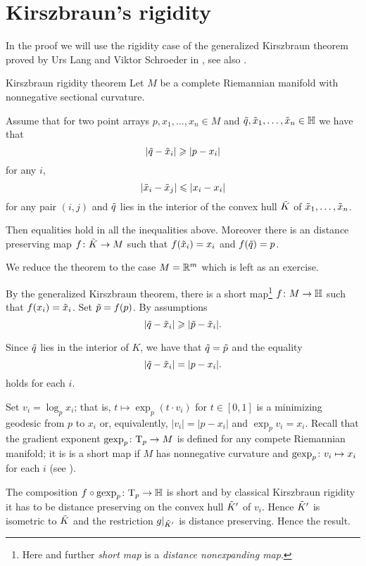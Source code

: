 \section{Kirszbraun's rigidity}

In the proof we will use the rigidity case of the generalized Kirszbraun theorem proved by Urs Lang and Viktor Schroeder in \cite{LS}, see also \cite{AKP}.

\begin{thm}{Kirszbraun rigidity theorem}\label{thm:kirszbraun-rigid}
Let $M$ be a complete Riemannian manifold with nonnegative sectional curvature.

Assume that for two point arrays $p,x_1,\dots,x_n\in M$ and $\~q, \~x_1,\dots,\~x_n\in \HH$ we have that 
\[|\~q-\~x_i|\ge |p-x_i|\]
for any $i$,
\[|\~x_i-\~x_j|\le |x_i-x_i|\]
for any pair $(i,j)$
and $\~q$ lies in the interior of the convex hull $\~K$ of $\~x_1,\dots,\~x_n$.

Then equalities hold in all the inequalities above.
Moreover there is an distance preserving map $f\:\~K\to M$ such that $f(\~x_i)=x_i$ and $f(\~q)=p$. 
\end{thm}

We reduce the theorem to the case $M=\RR^m$ which is left as an exercise.

By the generalized Kirszbraun theorem, there is a short map\footnote{Here and further \emph{short map} is a \emph{distance nonexpanding map}.} $f\:M\to \HH$
such that $f(x_i)=\~x_i$.
Set  $\~p=f(p)$.
By assumptions
\[|\~q-\~x_i|\ge |\~p-\~x_i|.\]

Since $\~q$ lies in the interior of $K$, we have that $\~q=\~p$ and the equality 
\[|\~q-\~x_i|= |p-x_i|.\]
holds for each $i$.

Set $v_i=\log_px_i$; that is, $t\mapsto \exp_p(t\cdot v_i)$ for $t\in[0,1]$ is a minimizing geodesic from $p$ to $x_i$ or, equivalently, $|v_i|=|p-x_i|$ and $\exp_pv_i=x_i$.
Recall that the gradient exponent $\gexp_p\:\T_p\to M$ is defined for any compete Riemannian manifold;
it is is a short map if $M$ has nonnegative curvature 
and $\gexp_p\:v_i\mapsto x_i$ for each $i$ (see \cite{AKP}).


The composition $f\circ \gexp_p\:\T_p\to \HH$ is short
and by classical Kirszbraun rigidity it has to be distance preserving on the convex hull $\~K'$ of $v_i$.
Hence $\~K'$ is isometric to $\~K$ and the restriction $g|_{\~K'}$ is distance preserving. 
Hence the result.
\qeds
